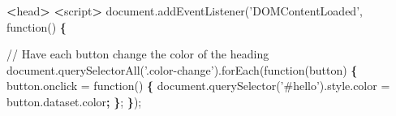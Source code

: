 \documentclass[]{book}
\newenvironment{Shaded}{\begin{snugshade}}{\end{snugshade}}
\newcommand{\ExtensionTok}[1]{#1}
\newcommand{\FunctionTok}[1]{\textcolor[rgb]{0.00,0.00,0.00}{#1}}
\newcommand{\KeywordTok}[1]{\textcolor[rgb]{0.13,0.29,0.53}{\textbf{#1}}}
\newcommand{\NormalTok}[1]{#1}
\newcommand{\OperatorTok}[1]{\textcolor[rgb]{0.81,0.36,0.00}{\textbf{#1}}}
\newcommand{\StringTok}[1]{\textcolor[rgb]{0.31,0.60,0.02}{#1}}
\begin{document}
\begin{Shaded}
\begin{Highlighting}[]
\OperatorTok{<}\FunctionTok{head}\OperatorTok{>}                                                                                  
    \OperatorTok{<}\ExtensionTok{script}\OperatorTok{>}                                                                            
        \ExtensionTok{document.addEventListener}\NormalTok{(}\StringTok{'DOMContentLoaded'}\NormalTok{, function() }\KeywordTok{\{}                      
                                                                                        
            \ExtensionTok{//}\NormalTok{ Have each button change the color of the heading                         }
            \ExtensionTok{document.querySelectorAll}\NormalTok{(}\StringTok{'.color-change'}\NormalTok{)}\ExtensionTok{.forEach}\NormalTok{(function(button) }\KeywordTok{\{}       
                \ExtensionTok{button.onclick}\NormalTok{ = function() }\KeywordTok{\{}                                           
                    \ExtensionTok{document.querySelector}\NormalTok{(}\StringTok{'#hello'}\NormalTok{)}\ExtensionTok{.style.color}\NormalTok{ = button.dataset.color}\KeywordTok{;}
                \KeywordTok{\}}\NormalTok{;                                                                      }
            \KeywordTok{\}}\NormalTok{);                                                                         }
                                                                                        

\end{Highlighting}
\end{Shaded}
\end{document}
